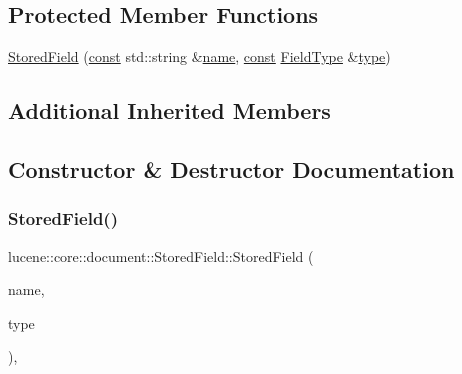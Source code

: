 \subsection*{Protected Member Functions}
\begin{DoxyCompactItemize}
\item 
\mbox{\hyperlink{classlucene_1_1core_1_1document_1_1StoredField_a941109198ad8fe7c8495bb1cdab4c80b}{Stored\+Field}} (\mbox{\hyperlink{ZlibCrc32_8h_a2c212835823e3c54a8ab6d95c652660e}{const}} std\+::string \&\mbox{\hyperlink{classlucene_1_1core_1_1document_1_1Field_a52f673f3b3abb14b180f5159f4726537}{name}}, \mbox{\hyperlink{ZlibCrc32_8h_a2c212835823e3c54a8ab6d95c652660e}{const}} \mbox{\hyperlink{classlucene_1_1core_1_1document_1_1FieldType}{Field\+Type}} \&\mbox{\hyperlink{classlucene_1_1core_1_1document_1_1Field_a7d5849d933ebde73422710069643ccff}{type}})
\end{DoxyCompactItemize}
\subsection*{Additional Inherited Members}


\subsection{Constructor \& Destructor Documentation}
\mbox{\label{classlucene_1_1core_1_1document_1_1StoredField_a941109198ad8fe7c8495bb1cdab4c80b}} 
\subsubsection{\texorpdfstring{Stored\+Field()}{StoredField()}\hspace{0.1cm}{\footnotesize\ttfamily [1/15]}}
{\footnotesize\ttfamily lucene\+::core\+::document\+::\+Stored\+Field\+::\+Stored\+Field (\begin{DoxyParamCaption}\item[{\mbox{\hyperlink{ZlibCrc32_8h_a2c212835823e3c54a8ab6d95c652660e}{const}} std\+::string \&}]{name,  }\item[{\mbox{\hyperlink{ZlibCrc32_8h_a2c212835823e3c54a8ab6d95c652660e}{const}} \mbox{\hyperlink{classlucene_1_1core_1_1document_1_1FieldType}{Field\+Type}} \&}]{type }\end{DoxyParamCaption})\hspace{0.3cm}{\ttfamily [inline]}, {\ttfamily [protected]}}

